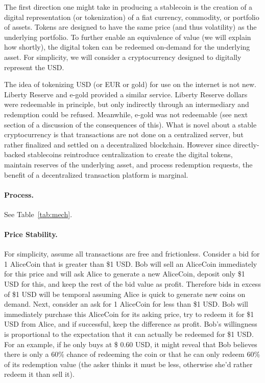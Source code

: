 The first direction one might take in producing a stablecoin is the creation of a digital representation (or tokenization) of a fiat currency, commodity, or portfolio of assets. Tokens are designed to have the same price (and thus volatility) as the underlying portfolio. To further enable an equivalence of value (we will explain how shortly), the digital token can be redeemed on-demand for the underlying asset. For simplicity, we will consider a cryptocurrency designed to digitally represent the USD.

The idea of tokenizing USD (or EUR or gold) for use on the internet is not new. Liberty Reserve and e-gold provided a similar service. Liberty Reserve dollars were redeemable in principle, but only indirectly through an intermediary and redemption could be refused. Meanwhile, e-gold was not redeemable (see next section of a discussion of the consequences of this). What is novel about a stable cryptocurrency is that transactions are not done on a centralized server, but rather finalized and settled on a decentralized blockchain. However since directly-backed stablecoins reintroduce centralization to create the digital tokens, maintain reserves of the underlying asset, and process redemption requests, the benefit of a decentralized transaction platform is marginal.

\paragraph{Process.} See Table~\ref{tab:mech}.

\paragraph{Price Stability.} For simplicity, assume all transactions are free and frictionless. Consider a bid for 1 AliceCoin that is greater than \$1 USD. Bob will sell an AliceCoin immediately for this price and will ask Alice to generate a new AliceCoin, deposit only \$1 USD for this, and keep the rest of the bid value as profit. Therefore bids in excess of \$1 USD will be temporal assuming Alice is quick to generate new coins on demand. Next, consider an ask for 1 AliceCoin for less than \$1 USD. Bob will immediately purchase this AliceCoin for its asking price, try to redeem it for \$1 USD from Alice, and if successful, keep the difference as profit. Bob's willingness is proportional to the expectation that it can actually be redeemed for \$1 USD. For an example, if he only buys at \$ 0.60 USD, it might reveal that Bob believes there is only a 60\% chance of redeeming the coin or that he can only redeem 60\% of its redemption value (the asker thinks it must be less, otherwise she'd rather redeem it than sell it).

